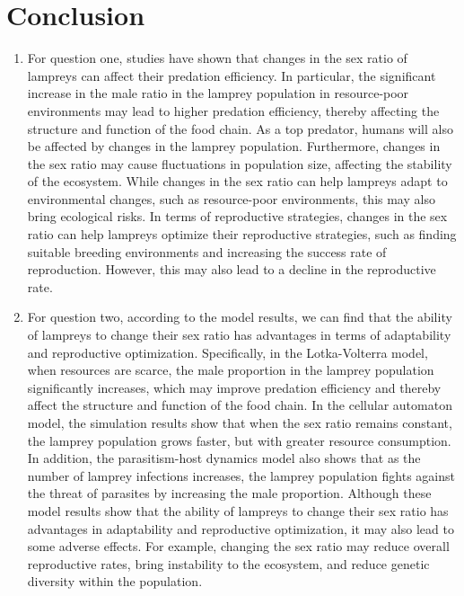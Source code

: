 \documentclass[CTeX = true]{mcmthesis}  %
\begin{document}
\section{Conclusion}

\begin{enumerate}
\item For question one, studies have shown that changes in the sex ratio of lampreys can affect their predation efficiency. In particular, the significant increase in the male ratio in the lamprey population in resource-poor environments may lead to higher predation efficiency, thereby affecting the structure and function of the food chain. As a top predator, humans will also be affected by changes in the lamprey population. Furthermore, changes in the sex ratio may cause fluctuations in population size, affecting the stability of the ecosystem. While changes in the sex ratio can help lampreys adapt to environmental changes, such as resource-poor environments, this may also bring ecological risks. In terms of reproductive strategies, changes in the sex ratio can help lampreys optimize their reproductive strategies, such as finding suitable breeding environments and increasing the success rate of reproduction. However, this may also lead to a decline in the reproductive rate. 
\item For question two, according to the model results, we can find that the ability of lampreys to change their sex ratio has advantages in terms of adaptability and reproductive optimization. Specifically, in the Lotka-Volterra model, when resources are scarce, the male proportion in the lamprey population significantly increases, which may improve predation efficiency and thereby affect the structure and function of the food chain. In the cellular automaton model, the simulation results show that when the sex ratio remains constant, the lamprey population grows faster, but with greater resource consumption. In addition, the parasitism-host dynamics model also shows that as the number of lamprey infections increases, the lamprey population fights against the threat of parasites by increasing the male proportion. Although these model results show that the ability of lampreys to change their sex ratio has advantages in adaptability and reproductive optimization, it may also lead to some adverse effects. For example, changing the sex ratio may reduce overall reproductive rates, bring instability to the ecosystem, and reduce genetic diversity within the population.

\end{enumerate}
\end{document}

